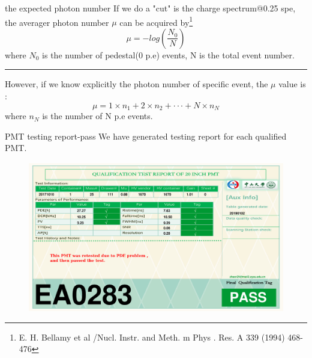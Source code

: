 \documentclass[11pt,compress,xcolor=x11names,UTF8]{beamer}
\begin{document}
\begin{frame}{ the expected photon number}
	If we do a "cut" is the charge spectrum@0.25 spe, the averager photon number $\mu$ can be acquired by\footnote{E. H. Bellamy et al /Nucl. Instr. and Meth. m Phys . Res. A 339 (1994) 468-476}
\begin{equation}
	\mu=-log(\frac{N_{0}}{N})
\end{equation}
	where $N_{0}$ is the number of pedestal(0 p.e) events, N is the total event number.
\vspace{.3cm}
\hrule{\textwidth}
\vspace{.3cm}
However, if we know explicitly the photon number of specific event, the $\mu$ value is :
\begin{equation}
	\mu=1\times n_{1}+2\times n_{2}+\cdot\cdot\cdot+N\times n_{N}
\end{equation}
	where $n_{N}$ is the number of N p.e events.
\end{frame}
\begin{frame}{PMT testing report-pass}
We have generated testing report for each qualified PMT.
\vspace{-.2cm}
\begin{figure}
\centering
\includegraphics[width=1.0\textwidth]{figures/SN_EA0283_pde1_dcr1_HV1_pv1_rt1_tag1.png}
\end{figure}
\end{frame}
\end{document}
